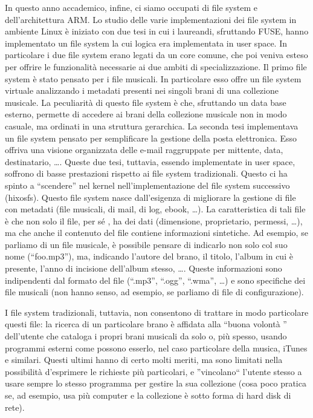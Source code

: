 \documentclass[a4paper,12pt]{article}
\newcommand{\ua }{\`{u} }
\renewcommand{\aa }{\`{a} }
\newcommand{\ea }{\`{e} }
\newcommand{\egrave }{\'{e} }
\begin{document}
In questo anno accademico, infine, ci siamo occupati di file system e dell'architettura ARM.
Lo studio delle varie implementazioni dei file system in ambiente Linux è iniziato con due tesi in cui i laureandi, sfruttando FUSE, hanno implementato un file system la cui logica era implementata in user space.
In particolare i due file system erano legati da un core comune, che poi veniva esteso per offrire le funzionalità necessarie ai due ambiti di specializzazione.
Il primo file system \ea stato pensato per i file musicali.
In particolare esso offre un file system virtuale analizzando i metadati presenti nei singoli brani di una collezione musicale.
La peculiarità di questo file system è che, sfruttando un data base esterno, permette di accedere ai brani della collezione musicale non in modo casuale, ma ordinati in una struttura gerarchica.
La seconda tesi implementava un file system pensato per semplificare la gestione della posta elettronica.
Esso offriva una visione organizzata delle e-mail raggruppate per mittente, data, destinatario, \dots.
Queste due tesi, tuttavia, essendo implementate in user space, soffrono di basse prestazioni rispetto ai file system tradizionali.
Questo ci ha spinto a ``scendere'' nel kernel nell'implementazione del file system successivo (hixosfs).
Questo file system nasce dall'esigenza di migliorare la gestione di file con metadati (file musicali, di mail, di log, ebook, \dots).
La caratteristica di tali file \ea che non solo il file, per s\egrave, ha dei dati (dimensione, proprietario, permessi, \dots), ma che anche il contenuto del file contiene informazioni sintetiche.
Ad esempio, se parliamo di un file musicale, \ea possibile pensare di indicarlo non solo col suo nome (``foo.mp3''), ma, indicando l'autore del brano, il titolo, l'album in cui \ea presente, l'anno di incisione dell'album stesso, \dots.
Queste informazioni sono indipendenti dal formato del file (``.mp3'', ``.ogg'', ``.wma'', \dots) e sono specifiche dei file musicali (non hanno senso, ad esempio, se parliamo di file di configurazione).

I file system tradizionali, tuttavia, non consentono di trattare in modo particolare questi file: la ricerca di un particolare brano \ea affidata alla ``buona volont\aa'' dell'utente che cataloga i propri brani musicali da solo o, pi\ua spesso, usando programmi esterni come possono esserlo, nel caso particolare della musica, iTunes e similari.
Questi ultimi hanno di certo molti meriti, ma sono limitati nella possibilit\aa d'esprimere le richieste pi\ua particolari, e ''vincolano`` l'utente stesso a usare sempre lo stesso programma per gestire la sua collezione (cosa poco pratica se, ad esempio, usa più computer e la collezione \ea sotto forma di hard disk di rete).
\end{document}
